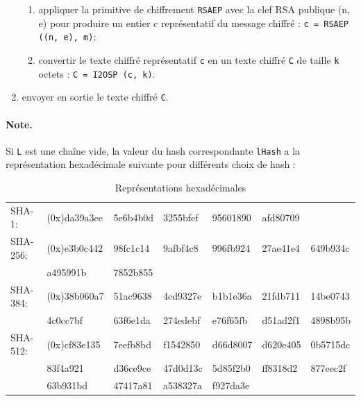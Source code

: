 \begin{enumerate}
\begin{enumerate}
\item appliquer la primitive de chiffrement \texttt{RSAEP} avec la clef RSA publique (n, e) pour produire un entier c représentatif du message chiffré : \texttt{c = RSAEP ((n, e), m)};
\item convertir le texte chiffré représentatif \texttt{c} en un texte chiffré \texttt{C} de taille \texttt{k} octets : \texttt{C = I2OSP (c, k)}.\\
\end{enumerate}
\item envoyer en sortie le texte chiffré \texttt{C}.\\
\end{enumerate}
\paragraph{Note.\\} 
Si \texttt{L} est une chaîne vide, la valeur du hash correspondante \texttt{lHash} a la représentation hexadécimale suivante pour différents choix de hash :


\begin{table}[H]
\centering
\begin{tabularx}{17cm}{Xllllll}
SHA-1: & (0x)da39a3ee & 5e6b4b0d & 3255bfef & 95601890 & afd80709 & \\
SHA-256: & (0x)e3b0c442 & 98fc1c14 & 9afbf4c8 & 996fb924 & 27ae41e4 & 649b934c\\
& a495991b & 7852b855 & & & &\\
SHA-384: & (0x)38b060a7 & 51ac9638 & 4cd9327e & b1b1e36a & 21fdb711 & 14be0743\\
& 4c0cc7bf & 63f6e1da & 274edebf & e76f65fb & d51ad2f1 & 4898b95b\\
SHA-512: & (0x)cf83e135 & 7eefb8bd & f1542850 & d66d8007 & d620e405 & 0b5715dc\\
& 83f4a921 & d36ce9ce & 47d0d13c & 5d85f2b0 & ff8318d2 & 877eec2f\\
& 63b931bd & 47417a81 & a538327a & f927da3e & &\\
\end{tabularx}
\caption{Représentations hexadécimales}
\label{repres_hexa}
\end{table}


